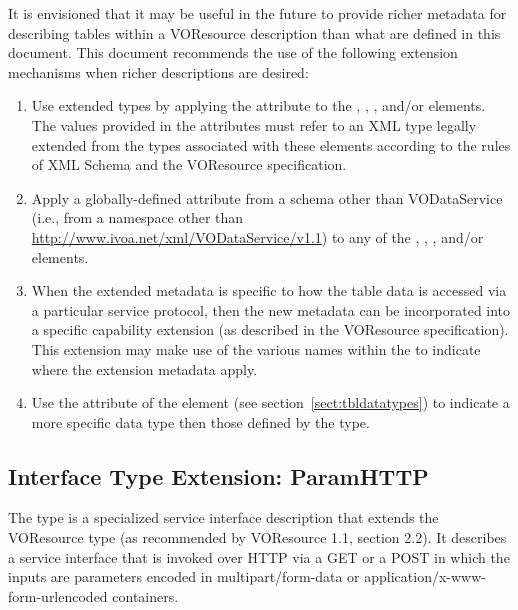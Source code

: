 \documentclass[11pt,a4paper]{ivoa}
\begin{document}
It is envisioned that it may be useful in the future to provide richer
metadata for describing tables within a VOResource description than
what are defined in this document.  This document recommends the
use of the following extension mechanisms when richer descriptions are
desired:

\begin{enumerate}
\item Use extended types by applying the 
       attribute to the ,
       , ,
        and/or
        elements.  The values provided in the
       attributes must refer to an XML type legally extended from the types
       associated with these elements according to the rules of XML Schema
       \citep{std:XSD} and the VOResource specification.

\item Apply a globally-defined attribute from a schema other than
       VODataService (i.e., from a namespace other than
       \url{http://www.ivoa.net/xml/VODataService/v1.1}) to any of the
       , ,
       , and/or 
       elements.

\item When the extended metadata is specific to how the table data is
       accessed via a particular service protocol, then the new
       metadata can be incorporated into a specific capability
       extension (as described in the VOResource specification).
       This extension may make use of the
       various names within the  to
       indicate where the extension metadata apply.

\item Use the  attribute of the
        element (see
       section~\ref{sect:tbldatatypes})
       to indicate a more specific data type then those defined by the
        type.
\end{enumerate}


\subsection{Interface Type Extension: ParamHTTP}
\label{sect:paramif}

The  type is a specialized service interface
description that extends the VOResource  type
(as recommended by VOResource 1.1, section 2.2).  It
describes a service interface that is invoked over HTTP via a GET or a
POST in which the inputs are parameters
encoded in multipart/form-data or application/x-www-form-urlencoded
containers.
\end{document}
